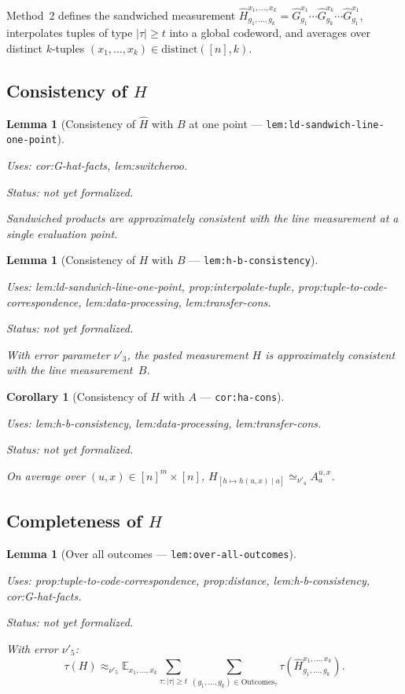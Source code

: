 \documentclass{article}
\providecommand{\uses}[1]{\par\smallskip\noindent\emph{Uses:} #1.\par\smallskip}
\providecommand{\notready}{\par\smallskip\noindent\emph{Status: not yet formalized.}\par\smallskip}
\newtheorem{lemma}[definition]{Lemma}
\newtheorem{corollary}[definition]{Corollary}
\theoremstyle{remark}
\newcommand{\E}{\mathbb{E}}
\begin{document}
Method~2 defines the sandwiched measurement
$\widehat{H}^{x_1,\dots,x_k}_{g_1,\dots,g_k}
	=\widehat{G}^{x_1}_{g_1}\cdots\widehat{G}^{x_k}_{g_k}\cdots\widehat{G}^{x_1}_{g_1}$,
interpolates tuples of type $|\tau|\ge t$ into a global codeword, and averages
over distinct $k$-tuples $(x_1,\dots,x_k)\in\mathrm{distinct}([n],k)$.

\subsection{Consistency of $H$}

\begin{lemma}[Consistency of $\widehat{H}$ with $B$ at one point ---
		\texttt{lem:ld-sandwich-line-one-point}]
	\label{lem:ld-sandwich-line-one-point}
	\uses{cor:G-hat-facts, lem:switcheroo}
	\notready
	Sandwiched products are approximately consistent with the line measurement
	at a single evaluation point.
\end{lemma}

\begin{lemma}[Consistency of $H$ with $B$ --- \texttt{lem:h-b-consistency}]
	\label{lem:h-b-consistency}
	\uses{lem:ld-sandwich-line-one-point, prop:interpolate-tuple,
		prop:tuple-to-code-correspondence, lem:data-processing, lem:transfer-cons}
	\notready
	With error parameter $\nu'_3$, the pasted measurement $H$ is approximately
	consistent with the line measurement~$B$.
\end{lemma}

\begin{corollary}[Consistency of $H$ with $A$ --- \texttt{cor:ha-cons}]
	\label{cor:ha-cons}
	\uses{lem:h-b-consistency, lem:data-processing, lem:transfer-cons}
	\notready
	On average over $(u,x)\in[n]^m\times[n]$,
	$H_{[h\mapsto h(u,x)\mid a]}\simeq_{\nu'_4} A^{u,x}_a$.
\end{corollary}

\subsection{Completeness of $H$}

\begin{lemma}[Over all outcomes --- \texttt{lem:over-all-outcomes}]
	\label{lem:over-all-outcomes}
	\uses{prop:tuple-to-code-correspondence, prop:distance,
		lem:h-b-consistency, cor:G-hat-facts}
	\notready
	With error $\nu'_5$:
	\[
		\tau(H)\approx_{\nu'_5}
		\E_{x_1,\dots,x_k}\sum_{\tau:|\tau|\ge t}
		\sum_{(g_1,\dots,g_k)\in\mathrm{Outcomes}_\tau}
		\tau\!(\widehat{H}^{x_1,\dots,x_k}_{g_1,\dots,g_k}).
	\]
\end{lemma}
\end{document}
